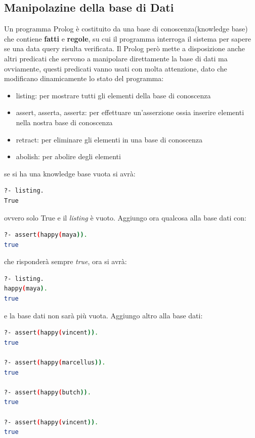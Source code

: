 \documentclass[a4paper]{book}
\begin{document}
\subsection{Manipolazine della base di Dati}
Un programma Prolog è costituito da una base di conoscenza(knowledge base) che contiene \textbf{fatti} e \textbf{regole},
su cui il programma interroga il sistema per sapere se una data query risulta verificata.\newline
Il Prolog però mette a disposizione anche altri predicati che servono a manipolare direttamente la base di dati ma ovviamente,
questi predicati vanno usati con molta attenzione, dato che modificano dinamicamente lo stato del programma:
\begin{itemize}
\item listing: per mostrare tutti gli elementi della base di conoscenza
\item assert, asserta, assertz: per effettuare un'asserzione ossia inserire elementi nella nostra base di conoscenza
\item retract: per eliminare gli elementi in una base di conoscenza
\item abolish: per abolire degli elementi
\end{itemize}
se si ha una knowledge base vuota si avrà:
\begin{shaded}
\begin{lstlisting}[language=bash]
?- listing.
True
\end{lstlisting}
\end{shaded}
ovvero solo True e il \textit{listing} è vuoto.\newline
Aggiungo ora qualcosa alla base dati con:
\begin{shaded}
\begin{lstlisting}[language=bash]
?- assert(happy(maya)).
true
\end{lstlisting}
\end{shaded}
che risponderà sempre \textit{true}, ora si avrà:
\begin{shaded}
\begin{lstlisting}[language=bash]
?- listing.
happy(maya).
true
\end{lstlisting}
\end{shaded}
e la base dati non sarà più vuota.\newline
Aggiungo altro alla base dati:
\begin{shaded}
\begin{lstlisting}[language=bash]
?- assert(happy(vincent)).
true

?- assert(happy(marcellus)).
true

?- assert(happy(butch)).
true

?- assert(happy(vincent)).
true
\end{lstlisting}
\end{shaded}
\end{document}
